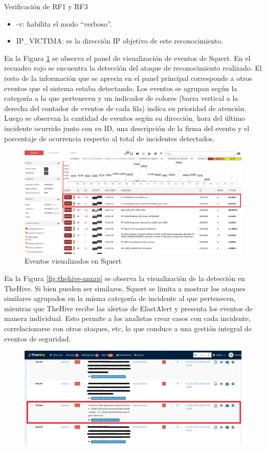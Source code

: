 \begin{section}{Verificación de RF1 y RF3}
\begin{itemize}
    \item -v: habilita el modo “verboso”.
    \item IP\_VICTIMA: es la dirección IP objetivo de este reconocimiento.
    \end{itemize}
    En la Figura \ref{fig:squert-nmap} se observa el panel de visualización de eventos de Squert.  En el recuadro rojo se encuentra la detección del ataque de reconocimiento realizado. El resto de la información que se aprecia en el panel principal corresponde a otros eventos que el sistema estaba detectando. Los eventos se agrupan según la categoría a la que pertenecen y un indicador de colores (barra vertical a la derecha del contador de eventos de cada fila) indica su prioridad de atención. %
    Luego se observan la cantidad de eventos según su dirección, hora del último incidente ocurrido junto con su ID, una descripción de la firma del evento y el porcentaje de ocurrencia respecto al total de incidentes detectados.
    \begin{figure}[H]
    \centering
    \includegraphics[width=1\textwidth]{./iteracion_1_imagenes/Squert_NMAP.png}
    \caption{Eventos visualizados en Squert}
    \label{fig:squert-nmap}
    \end{figure}
    \FloatBarrier
    En la Figura \ref{fig:thehive-nmap} se observa la visualización de la detección en TheHive. Si bien pueden ser similares, Squert se limita a mostrar los ataques similares agrupados en la misma categoría de incidente al que pertenecen, mientras que TheHive recibe las alertas de ElastAlert y presenta los eventos de manera individual. Esto permite a los analistas crear casos con cada incidente, correlacionarse con otros ataques, etc, lo que conduce a una gestión integral de eventos de seguridad.
    \begin{figure}[H]
    \centering
    \includegraphics[width=1\textwidth]{./iteracion_1_imagenes/TheHive-NMAPEditado.png}

\end{figure}
\end{section}
